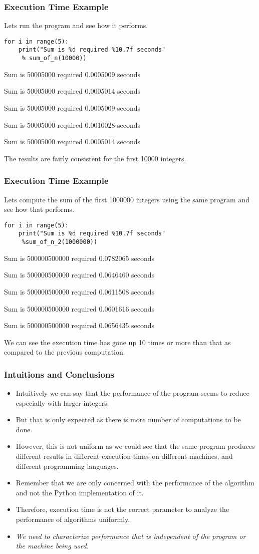 \documentclass{beamer}
\begin{document}
\begin{frame}[fragile]
\frametitle{Execution Time Example}
Lets run the program and see how it performs.
\begin{lstlisting}
for i in range(5):
    print("Sum is %d required %10.7f seconds"
     % sum_of_n(10000))

\end{lstlisting}
Sum is 50005000 required  0.0005009 seconds

Sum is 50005000 required  0.0005014 seconds

Sum is 50005000 required  0.0005009 seconds

Sum is 50005000 required  0.0010028 seconds

Sum is 50005000 required  0.0005014 seconds

The results are fairly consistent for the first 10000 integers.
\end{frame}

\begin{frame}[fragile]
\frametitle{Execution Time Example}
Lets compute the sum of the first 1000000 integers using the same program and see how that performs.
\begin{lstlisting}
for i in range(5):
    print("Sum is %d required %10.7f seconds"
     %sum_of_n_2(1000000))

\end{lstlisting}

Sum is 500000500000 required  0.0782065 seconds

Sum is 500000500000 required  0.0646460 seconds

Sum is 500000500000 required  0.0611508 seconds

Sum is 500000500000 required  0.0601616 seconds

Sum is 500000500000 required  0.0656435 seconds

We can see the execution time has gone up 10 times or more than that as compared to the previous computation.
\end{frame}

\begin{frame}
\frametitle{Intuitions and Conclusions}
\begin{itemize}
\item Intuitively we can say that the performance of the program seems to reduce especially with larger integers.
\item But that is only expected as there is more number of computations to be done.
\item However, this is not uniform as we could see that the same program produces different results in different execution times on different machines, and different programming languages.
\item Remember that we are only concerned with the performance of the algorithm and not the Python implementation of it.
\item Therefore, execution time is not the correct parameter to analyze the performance of algorithms uniformly.
\item \textit{We need to characterize performance that is independent of the program or the machine being used.}
\end{itemize}
\end{frame}
\end{document}
